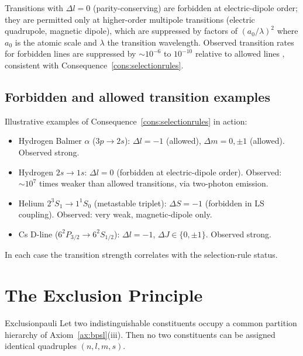 \begin{corollary}
\label{cor:forbidden}
Transitions with $\Delta l=0$ (parity-conserving) are forbidden at electric-dipole order; they are permitted only at higher-order multipole transitions (electric quadrupole, magnetic dipole), which are suppressed by factors of $(a_{0}/\lambda)^{2}$ where $a_{0}$ is the atomic scale and $\lambda$ the transition wavelength. Observed transition rates for forbidden lines are suppressed by $\sim 10^{-6}$ to $10^{-10}$ relative to allowed lines \citep{herzberg1944}, consistent with Consequence~\ref{cons:selectionrules}.
\end{corollary}

\subsection{Forbidden and allowed transition examples}

Illustrative examples of Consequence~\ref{cons:selectionrules} in action:
\begin{itemize}
\item Hydrogen Balmer $\alpha$ ($3p\to 2s$): $\Delta l=-1$ (allowed), $\Delta m=0,\pm 1$ (allowed). Observed strong.
\item Hydrogen $2s\to 1s$: $\Delta l=0$ (forbidden at electric-dipole order). Observed: $\sim 10^{7}$ times weaker than allowed transitions, via two-photon emission.
\item Helium $2^{3}S_{1}\to 1^{1}S_{0}$ (metastable triplet): $\Delta S=-1$ (forbidden in LS coupling). Observed: very weak, magnetic-dipole only.
\item Cs D-line ($6^{2}P_{3/2}\to 6^{2}S_{1/2}$): $\Delta l=-1$, $\Delta J\in\{0,\pm 1\}$. Observed strong.
\end{itemize}
In each case the transition strength correlates with the selection-rule status.

\section{The Exclusion Principle}
\label{sec:pauli}

\begin{consequence}{Exclusion}{pauli}
Let two indistinguishable constituents occupy a common partition hierarchy of Axiom~\ref{ax:bpsl}(iii). Then no two constituents can be assigned identical quadruples $(n,l,m,s)$.
\end{consequence}

